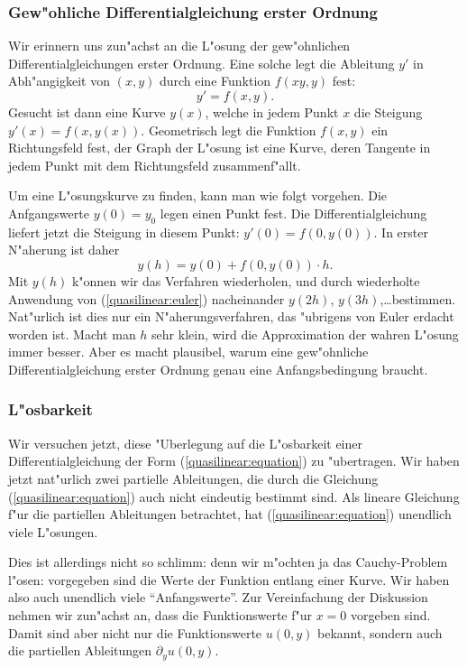 \subsubsection{Gew"ohliche Differentialgleichung erster Ordnung}
Wir erinnern uns zun"achst an die L"osung der gew"ohnlichen
Differentialgleichungen erster Ordnung.
Eine solche legt die Ableitung $y'$ in Abh"angigkeit von 
$(x,y)$ durch eine Funktion $f(xy,y)$ fest: 
\[
y'=f(x,y).
\]
Gesucht ist dann eine Kurve $y(x)$, welche
in jedem Punkt $x$ die Steigung $y'(x)=f(x,y(x))$.
Geometrisch legt die Funktion $f(x,y)$ ein Richtungsfeld fest,
der Graph der L"osung ist eine Kurve, deren Tangente in jedem
Punkt mit dem Richtungsfeld zusammenf"allt.

Um eine L"osungskurve zu finden, kann man wie folgt vorgehen.
Die Anfgangswerte  $y(0)=y_0$ legen einen Punkt fest.
Die Differentialgleichung liefert jetzt die Steigung in
diesem Punkt: $y'(0)=f(0,y(0))$.
In erster N"aherung ist daher
\begin{equation}
y(h)=y(0)+f(0,y(0))\cdot h.
\label{quasilinear:euler}
\end{equation}
Mit $y(h)$ k"onnen wir das Verfahren wiederholen, und durch
wiederholte Anwendung von (\ref{quasilinear:euler})
nacheinander $y(2h)$, $y(3h)$,\dots bestimmen.
Nat"urlich ist dies nur ein N"aherungsverfahren, das "ubrigens
von Euler erdacht worden ist. Macht man $h$ sehr klein, wird
die Approximation der wahren L"osung immer besser.
Aber es macht plausibel, warum eine gew"ohnliche Differentialgleichung
erster Ordnung genau eine Anfangsbedingung braucht.

\subsubsection{L"osbarkeit}
Wir versuchen jetzt, diese "Uberlegung auf die L"osbarkeit einer
Differentialgleichung der Form (\ref{quasilinear:equation}) zu 
"ubertragen. Wir haben jetzt nat"urlich zwei partielle Ableitungen, die
durch die Gleichung (\ref{quasilinear:equation}) auch nicht
eindeutig bestimmt sind. Als lineare Gleichung f"ur die partiellen
Ableitungen betrachtet, hat (\ref{quasilinear:equation}) unendlich 
viele L"osungen.

Dies ist allerdings nicht so schlimm: denn wir m"ochten ja das Cauchy-Problem
l"osen: vorgegeben sind die Werte der Funktion entlang einer Kurve.
Wir haben also auch unendlich viele ``Anfangswerte''.
Zur Vereinfachung der Diskussion nehmen wir zun"achst an, dass die
Funktionswerte f"ur $x=0$ vorgeben sind.
Damit sind aber nicht nur die Funktionswerte $u(0,y)$ bekannt, sondern
auch die partiellen Ableitungen $\partial_yu(0,y)$.

